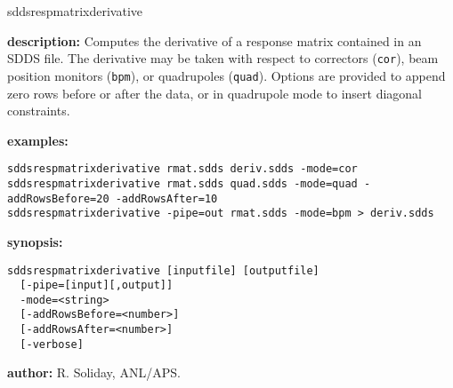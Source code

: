 %
\begin{sddsprog}{sddsrespmatrixderivative}
  \item \textbf{description:} Computes the derivative of a response matrix contained in an SDDS file. The derivative may be taken with respect to correctors (\verb|cor|), beam position monitors (\verb|bpm|), or quadrupoles (\verb|quad|). Options are provided to append zero rows before or after the data, or in quadrupole mode to insert diagonal constraints.
  \item \textbf{examples:}
    \begin{verbatim}
sddsrespmatrixderivative rmat.sdds deriv.sdds -mode=cor
sddsrespmatrixderivative rmat.sdds quad.sdds -mode=quad -addRowsBefore=20 -addRowsAfter=10
sddsrespmatrixderivative -pipe=out rmat.sdds -mode=bpm > deriv.sdds
    \end{verbatim}
  \item \textbf{synopsis:}
    \begin{verbatim}
sddsrespmatrixderivative [inputfile] [outputfile]
  [-pipe=[input][,output]]
  -mode=<string>
  [-addRowsBefore=<number>]
  [-addRowsAfter=<number>]
  [-verbose]
    \end{verbatim}
  \item \textbf{author:} R. Soliday, ANL/APS.
\end{sddsprog}
